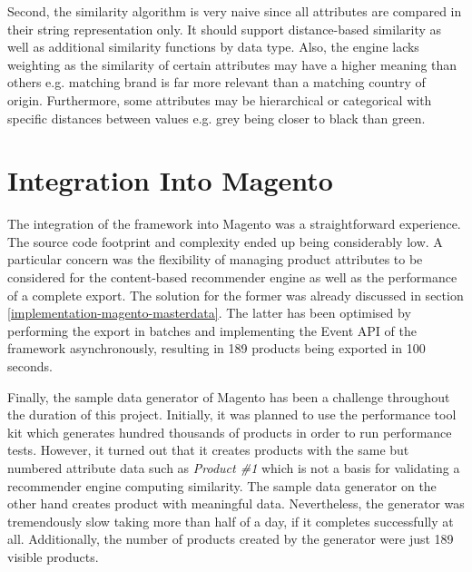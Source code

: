 Second, the similarity algorithm is very naive since all attributes are compared in their string representation only. It should support distance-based similarity as well as additional similarity functions by data type. Also, the engine lacks weighting as the similarity of certain attributes may have a higher meaning than others e.g. matching brand is far more relevant than a matching country of origin. Furthermore, some attributes may be hierarchical or categorical with specific distances between values e.g. grey being closer to black than green.

\section{Integration Into Magento}
\label{evaluation-domain}

The integration of the framework into Magento was a straightforward experience. The source code footprint and complexity ended up being considerably low. A particular concern was the flexibility of managing product attributes to be considered for the content-based recommender engine as well as the performance of a complete export. The solution for the former was already discussed in section \ref{implementation-magento-masterdata}. The latter has been optimised by performing the export in batches and implementing the Event API of the framework asynchronously, resulting in 189 products being exported in 100 seconds.

Finally, the sample data generator of Magento has been a challenge throughout the duration of this project. Initially, it was planned to use the performance tool kit which generates hundred thousands of products in order to run performance tests. However, it turned out that it creates products with the same but numbered attribute data such as \emph{Product \#1} which is not a basis for validating a recommender engine computing similarity. The sample data generator on the other hand creates product with meaningful data. Nevertheless, the generator was tremendously slow taking more than half of a day, if it completes successfully at all. Additionally, the number of products created by the generator were just 189 visible products.
